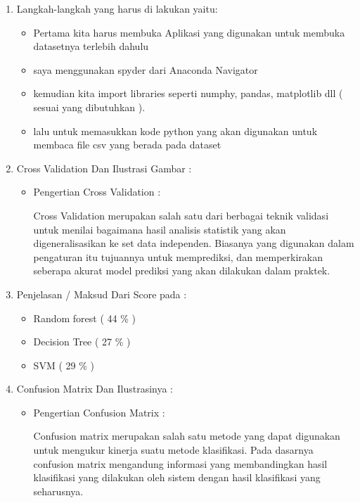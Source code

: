 \begin{enumerate}
\item Langkah-langkah  yang harus di lakukan yaitu:
\begin{itemize}
\item Pertama kita harus membuka Aplikasi yang digunakan untuk membuka datasetnya terlebih dahulu 
\item saya menggunakan spyder dari Anaconda Navigator
\item kemudian kita import libraries seperti numphy, pandas, matplotlib dll ( sesuai yang dibutuhkan ).
\item lalu untuk memasukkan kode python yang akan digunakan untuk membaca file csv yang berada pada dataset 
\end{itemize}
\item Cross Validation Dan Ilustrasi Gambar :
\begin{itemize}
\item Pengertian Cross Validation :
\par Cross Validation merupakan salah satu dari berbagai teknik validasi untuk menilai bagaimana hasil analisis statistik yang akan digeneralisasikan ke set data independen. Biasanya yang digunakan dalam pengaturan itu tujuannya  untuk memprediksi, dan  memperkirakan seberapa akurat model prediksi yang akan dilakukan dalam praktek. 
\par 
\end{itemize}
\par
\item Penjelasan / Maksud Dari Score pada :
\begin{itemize}
\item Random forest ( 44 \% )
\par 
\par
\item Decision Tree ( 27 \% )
\par 
\par
\item SVM ( 29 \% )
\end{itemize}
\item Confusion Matrix Dan Ilustrasinya :
\begin{itemize}
\item Pengertian Confusion Matrix :
\par Confusion matrix merupakan salah satu metode yang dapat digunakan untuk mengukur kinerja suatu metode klasifikasi. Pada dasarnya confusion matrix mengandung informasi yang membandingkan hasil klasifikasi yang dilakukan oleh sistem dengan hasil klasifikasi yang seharusnya.

\end{itemize}
\end{enumerate}
